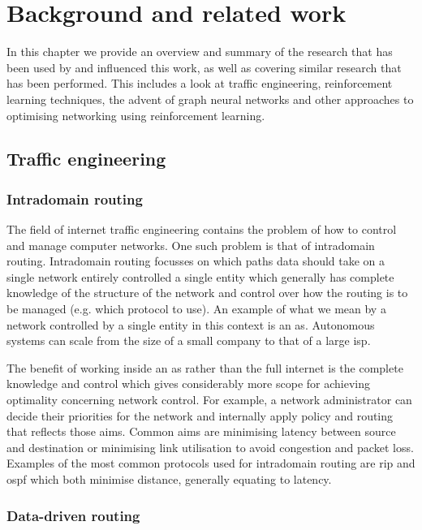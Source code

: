 \chapter{Background and related work}
\label{chapter:background}

In this chapter we provide an overview and summary of the research that has been used by and influenced this work, as well as covering similar research that has been performed. This includes a look at traffic engineering, reinforcement learning techniques, the advent of graph neural networks and other approaches to optimising networking using reinforcement learning.


\section{Traffic engineering}

\subsection{Intradomain routing}

The field of internet traffic engineering contains the problem of how to control and manage computer networks. One such problem is that of intradomain routing. Intradomain routing focusses on which paths data should take on a single network entirely controlled a single entity which generally has complete knowledge of the structure of the network and control over how the routing is to be managed (e.g. which protocol to use). An example of what we mean by a network controlled by a single entity in this context is an \ac{as}. Autonomous systems can scale from the size of a small company to that of a large \ac{isp}.

The benefit of working inside an \ac{as} rather than the full internet is the complete knowledge and control which gives considerably more scope for achieving optimality concerning network control. For example, a network administrator can decide their priorities for the network and internally apply policy and routing that reflects those aims. Common aims are minimising latency between source and destination or minimising link utilisation to avoid congestion and packet loss. Examples of the most common protocols used for intradomain routing are \ac{rip}\cite{rfc2080} and \ac{ospf}\cite{rfc5340} which both minimise distance, generally equating to latency.

\subsection{Data-driven routing}

